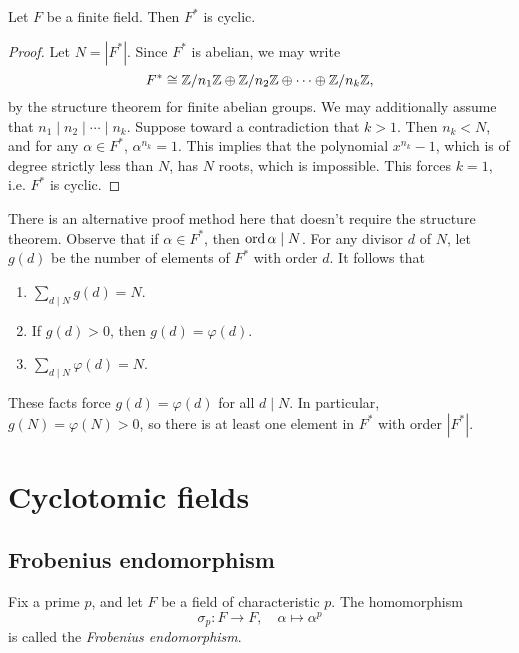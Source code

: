 \begin{theorem}
    Let $F$ be a finite field. Then $F^*$ is cyclic.
\end{theorem}

\begin{proof}
    Let $N = |F^*|$. Since $F^*$ is abelian, we may write
    \[
        F^* \cong \mathbb{{Z}}/{{n_1}}\mathbb{{Z}} \oplus \mathbb{{Z}}/{{n_2}}\mathbb{{Z}} \oplus \cdots \oplus \mathbb{{Z}}/{{n_k}}\mathbb{{Z}},
    \]
    by the structure theorem for finite abelian groups. We may additionally assume that $n_1 \mid n_2 \mid \cdots \mid n_k$. Suppose toward a contradiction that $k > 1$. Then $n_k < N$, and for any $\alpha \in F^*$, $\alpha^{n_k} = 1$. This implies that the polynomial $x^{n_k} - 1$, which is of degree strictly less than $N$, has $N$ roots, which is impossible. This forces $k = 1$, i.e. $F^*$ is cyclic.
\end{proof}

\begin{remark}
    There is an alternative proof method here that doesn't require the structure theorem. Observe that if $\alpha \in F^*$, then $\operatorname{ord}{\alpha} \mid N$. For any divisor $d$ of $N$, let $g(d)$ be the number of elements of $F^*$ with order $d$. It follows that
    \begin{enumerate}
        \item $\sum_{d \mid N} g(d) = N$.
        \item If $g(d) > 0$, then $g(d) = \varphi(d)$.
        \item $\sum_{d \mid N} \varphi(d) = N$.
    \end{enumerate}
    These facts force $g(d) = \varphi(d)$ for all $d \mid N$. In particular, $g(N) = \varphi(N) > 0$, so there is at least one element in $F^*$ with order $|F^*|$.
\end{remark}

\section{Cyclotomic fields}

\subsection{Frobenius endomorphism}

\begin{definition}
   Fix a prime $p$, and let $F$ be a field of characteristic $p$. The homomorphism
   \[
        \sigma_p: F \to F, \quad \alpha \longmapsto \alpha^p
   \]
   is called the \emph{Frobenius endomorphism}.
\end{definition}

